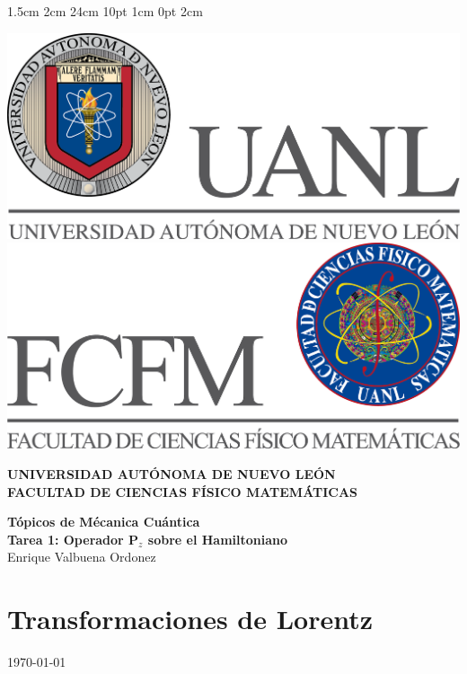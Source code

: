 \documentclass[12pt,letterpaper]{report}
\begin{document}
\setmargins{2.5cm}      
{1.5cm}                     
{2cm}  
{24cm}                    
{10pt}                          
{1cm}                          
{0pt}                             
{2cm}
\begin{titlepage}
\begin{center}
\includegraphics[scale=0.40]{../../Logos/uanl.png} 
\hspace{2.5cm}
\includegraphics[scale=0.40]{../../Logos/fcfm.png}
\end{center}
\vspace{2cm}
\begin{center}
\textbf{
UNIVERSIDAD AUTÓNOMA DE NUEVO LEÓN\\
FACULTAD DE CIENCIAS
    FÍSICO MATEMÁTICAS}\\
\vspace*{2cm}
\begin{large}
\vspace{1cm}
\large{\textbf{Tópicos de Mécanica Cuántica}}\\
\textbf{Tarea 1: Operador P$_{z}$ sobre el Hamiltoniano}\\
Enrique Valbuena Ordonez\\
\end{large}
\end{center}
\end{titlepage}
\section*{Transformaciones de Lorentz}
\vspace*{-1cm}
\begin{flushright}
    \today
\end{flushright}
\end{document}
